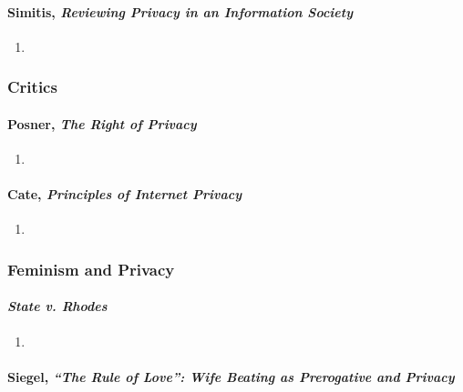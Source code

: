 \paragraph{Simitis, \emph{Reviewing Privacy in an Information Society}}

\begin{enumerate}
    \item %
\end{enumerate}

\subsubsection{Critics}

\paragraph{Posner, \emph{The Right of Privacy}}

\begin{enumerate}
    \item %
\end{enumerate}

\paragraph{Cate, \emph{Principles of Internet Privacy}}

\begin{enumerate}
    \item %
\end{enumerate}

\subsubsection{Feminism and Privacy}

\paragraph{\emph{State v. Rhodes}}

\begin{enumerate}
    \item %
\end{enumerate}

\paragraph{Siegel, \emph{``The Rule of Love'': Wife Beating as Prerogative and 
Privacy}}

